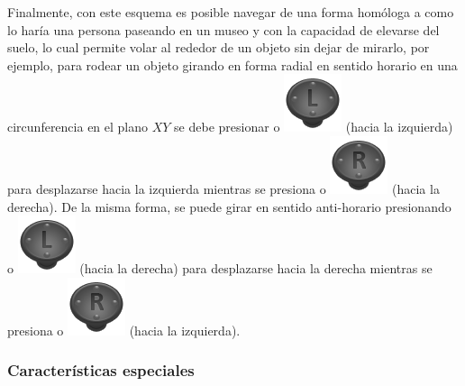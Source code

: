 Finalmente, con este esquema es posible navegar de una forma homóloga a como lo haría una persona paseando en un museo y con la capacidad de elevarse del suelo, lo cual permite volar al rededor de un objeto sin dejar de mirarlo, por ejemplo, para rodear un objeto girando en forma radial en sentido horario en una circunferencia en el plano $XY$ se debe presionar  o \includegraphics[scale=0.4, trim= 0 20 0 0]{images/visualizer/xbox360/leftStick.png} (hacia la izquierda) para desplazarse hacia la izquierda mientras se presiona \keystroke{$\rightarrow$} o \includegraphics[scale=0.4, trim= 0 20 0 0]{images/visualizer/xbox360/rightStick.png} (hacia la derecha). De la misma forma, se puede girar en sentido anti-horario presionando  o \includegraphics[scale=0.4, trim= 0 20 0 0]{images/visualizer/xbox360/leftStick.png} (hacia la derecha) para desplazarse hacia la derecha mientras se presiona \keystroke{$\leftarrow$} o \includegraphics[scale=0.4, trim= 0 20 0 0]{images/visualizer/xbox360/rightStick.png} (hacia la izquierda).

\subsubsection{Características especiales}
\label{ch:propuesta:sec:extraccionDeLaSuperficie:subsec:caracteristicasEspeciales}

